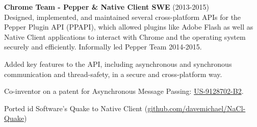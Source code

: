 \documentclass[10pt]{article}
\begin{document}
\begin{itemize}
\begin{item}
\end{item}
\begin{item}
	\textbf{Chrome Team - Pepper \& Native Client SWE} (2013-2015)\\
  Designed, implemented, and maintained several cross-platform APIs for the Pepper Plugin API (PPAPI), which allowed plugins like Adobe Flash as well as Native Client applications to interact with Chrome and the operating system securely and efficiently. Informally led Pepper Team 2014-2015.
  \begin{itemize}
  \begin{item}
  Added key features to the API, including asynchronous and synchronous communication and thread-safety, in a secure and cross-platform way.
  \end{item}
  \begin{item}
  Co-inventor on a patent for Asynchronous Message Passing: \href{https://image-ppubs.uspto.gov/dirsearch-public/print/downloadPdf/9128702}{US-9128702-B2}.
  \end{item}
  \begin{item}
  Ported id Software's Quake to Native Client (\href{https://github.com/davemichael/NaCl-Quake}{github.com/davemichael/NaCl-Quake})
  \end{item}
  \end{itemize}
\end{item}
\end{itemize}
\end{document}
